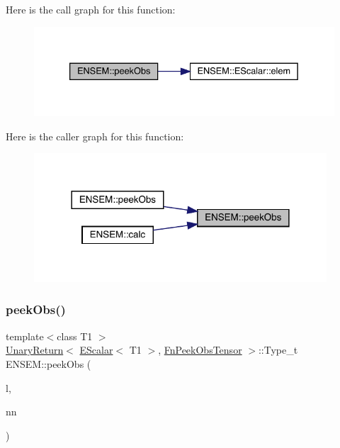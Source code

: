 Here is the call graph for this function\+:
\nopagebreak
\begin{figure}[H]
\begin{center}
\leavevmode
\includegraphics[width=333pt]{d4/dca/group__escalar_ga7b3199ffdfb57391566d3db05e9b38c1_cgraph}
\end{center}
\end{figure}
Here is the caller graph for this function\+:
\nopagebreak
\begin{figure}[H]
\begin{center}
\leavevmode
\includegraphics[width=310pt]{d4/dca/group__escalar_ga7b3199ffdfb57391566d3db05e9b38c1_icgraph}
\end{center}
\end{figure}
\mbox{\label{group__escalar_ga5715083f9573c91b9d4567559f4b2b30}} 
\subsubsection{\texorpdfstring{peekObs()}{peekObs()}\hspace{0.1cm}{\footnotesize\ttfamily [2/2]}}
{\footnotesize\ttfamily template$<$class T1 $>$ \\
\mbox{\hyperlink{structENSEM_1_1UnaryReturn}{Unary\+Return}}$<$ \mbox{\hyperlink{classENSEM_1_1EScalar}{E\+Scalar}}$<$ T1 $>$, \mbox{\hyperlink{structENSEM_1_1FnPeekObsTensor}{Fn\+Peek\+Obs\+Tensor}} $>$\+::Type\+\_\+t E\+N\+S\+E\+M\+::peek\+Obs (\begin{DoxyParamCaption}\item[{const \mbox{\hyperlink{classENSEM_1_1EScalar}{E\+Scalar}}$<$ T1 $>$ \&}]{l,  }\item[{const \mbox{\hyperlink{classXMLArray_1_1Array}{Array}}$<$ int $>$ \&}]{nn }\end{DoxyParamCaption})\hspace{0.3cm}{\ttfamily [inline]}}

